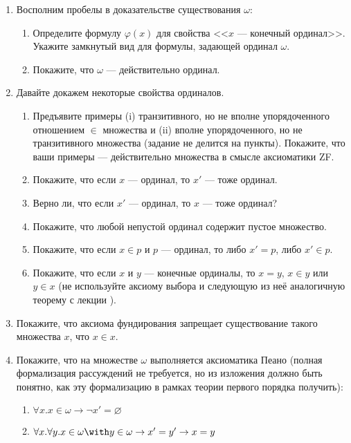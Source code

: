 \documentclass[10pt,a4paper,oneside]{article}
\begin{document}
\begin{enumerate}
\item Восполним пробелы в доказательстве существования $\omega$:
\begin{enumerate}
\item Определите формулу $\varphi(x)$ для свойства <<$x$ --- конечный ординал>>. Укажите замкнутый
вид для формулы, задающей ординал $\omega$.
\item Покажите, что $\omega$ --- действительно ординал.
\end{enumerate}

\item Давайте докажем некоторые свойства ординалов.
\begin{enumerate}
\item Предъявите примеры (i) транзитивного, но не вполне упорядоченного отношением $\in$ множества и (ii) вполне упорядоченного,
но не транзитивного множества (задание не делится на пункты). Покажите, что ваши примеры --- действительно множества в смысле аксиоматики ZF.
\item Покажите, что если $x$ --- ординал, то $x'$ --- тоже ординал.
\item Верно ли, что если $x'$ --- ординал, то $x$ --- тоже ординал?
\item Покажите, что любой непустой ординал содержит пустое множество.
\item Покажите, что если $x \in p$ и $p$ --- ординал, то либо $x' = p$, либо $x' \in p$.
\item Покажите, что если $x$ и $y$ --- конечные ординалы, то $x = y$, $x \in y$ или $y \in x$ (не используйте аксиому выбора
и следующую из неё аналогичную теорему с лекции ).
\end{enumerate}
\item Покажите, что аксиома фундирования запрещает существование такого множества $x$, что $x \in x$.
\item Покажите, что на множестве $\omega$ выполняется аксиоматика Пеано (полная формализация рассуждений не требуется,
но из изложения должно быть понятно, как эту формализацию в рамках теории первого порядка получить):
\begin{enumerate}
\item $\forall x.x \in \omega \rightarrow \neg x' = \varnothing$
\item $\forall x.\forall y.x \in \omega \with y \in \omega \rightarrow x' = y' \rightarrow x = y$

\end{enumerate}
\end{enumerate}
\end{document}
